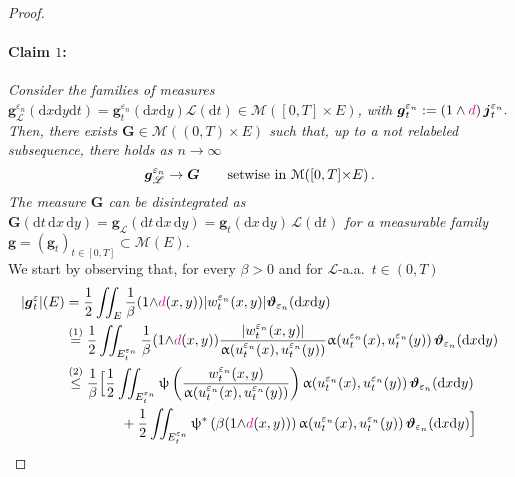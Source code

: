 \documentclass[11pt,reqno]{amsart}
\numberwithin{equation}{section}
\newcommand{\calM}{\mathcal{M}}
\newcommand{\scrL}{\mathscr{L}}
\newcommand{\eps}{\varepsilon}
\newcommand{\dd}{\mathrm{d}}
\theoremstyle{definition}
\newcommand{\ep}{\varepsilon}
\let\eps\ep
\def\dd{\mathrm{d}}
\newcommand{\teta}{\boldsymbol \vartheta}
\newcommand{\tetapien}{\boldsymbol{\teta}_{\eps_n}}
\newcommand{\Lebone}{\scrL}
\newcommand{\jj}{{\boldsymbol{j}}}
\newcommand{\bg}{{\boldsymbol{g}}}
\newcommand{\bG}{{\boldsymbol{G}}}
\newcommand{\Ed}{{E'}}
\newcommand{\ej}{\eps_n}
\newcommand{\RNEW}{\color{black}} %
\newcommand{\TODO}[1]{\todo[inline, color=cyan!20]{#1}}
\newcommand{\EEE}{\color{black}}
\newcommand{\dpi}{{\color{magenta} d}}
\numberwithin{equation}{section}
\begin{document}
\begin{proof}
\paragraph{\bf Claim $1$:}
{\sl Consider the families of measures $\bg_{\Lebone}^{\ej} (\dd x \dd y \dd t) =   \bg_t^{\ej}(\dd x \dd y) \Lebone(\dd t) \in  \calM([0,T]{\times}E)$, with 
$\bg_t^{\ej}:=(1\wedge \dpi)\, \jj_t^{\ej}.$ Then,
there exists \RNEW  $\bG \in \calM((0,T){\times}E)$ \EEE such that, up to a not relabeled subsequence, there holds as $n\to\infty$}
\begin{equation}
\label{setwise-g}
 \bg_{\Lebone}^{\ej}  \to \bG \qquad \text{setwise  in }    \RNEW \calM([0,T]{\times}E)\,. \EEE 
\end{equation}
{\sl The measure  $\bG$ can be disintegrated as $\bG(\dd t\,\dd x\,\dd y)= \bg_\Lebone(\dd t\,\dd x\,\dd y)
=  \bg_t(\dd x\,\dd y)\,\Lebone (\dd t) $  \EEE for a measurable family $ \bg = (\bg_t)_{t\in[0,T]} \subset \calM(E).$}
\\
We start by observing that, for every $\beta>0$  and    for $\Lebone$-a.a.\ $t\in (0,T)$
%
    \begin{equation}
    \label{calc1}
    \begin{aligned}
      |\bg_t^\varepsilon|(\RNEW E) \EEE 
        &= \RNEW \frac12  \iint_{E} \EEE \frac1\beta (1{\wedge}\dpi(x,y)) |w_t^{\ej}(x,y) |  \tetapien (\dd x \dd y )
        \\
        & 
        \stackrel{(1)}{=} \RNEW \frac12 \EEE \iint_{E_t^{\ej}}    \frac1\beta (1{\wedge}\dpi(x,y)) \frac{|w_t^{\ej}(x,y)|}{\upalpha(u_t^{\ej}(x), u_t^{\ej}(y))} \upalpha(u_t^{\ej}(x), u_t^{\ej}(y))
        \,   \tetapien  (\dd x \dd y )
       \\
       &    \stackrel{(2)}\leq  \frac1\beta 
       \Big[
   \RNEW \frac12 \EEE \iint_{E_t^{\ej}}   \uppsi\left(  \frac{w_t^{\ej}(x,y)}{\upalpha(u_t^{\ej}(x), u_t^{\ej}(y))}\right) \upalpha(u_t^{\ej}(x), u_t^{\ej}(y)) \,   \tetapien  (\dd x \dd y )
  \\
  & \qquad \qquad + \RNEW \frac12 \EEE  \iint_{E_t^{\ej}}   \uppsi^*\left( \beta  (1{\wedge}\dpi(x,y)) \right) \upalpha(u_t^{\ej}(x), u_t^{\ej}(y)) \,   \tetapien  (\dd x \dd y ) \Big]
  \\

\end{aligned}
\end{equation}
\end{proof}
\end{document}
